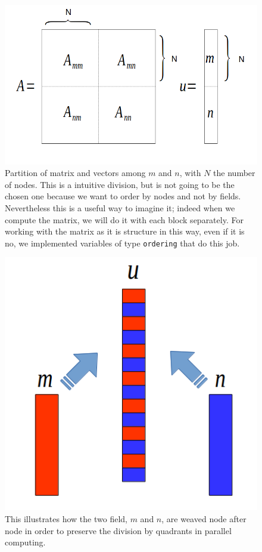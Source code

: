 \begin{figure}[h]
	\centering
	\includegraphics[width=0.7\linewidth]{A_m_n}
	\caption[Partition of matrix and vectors among $ m $ and $ n $]{Partition of matrix and vectors among $ m $ and $ n $, with $ N $ the number of nodes. This is a intuitive division, but is not going to be the chosen one because we want to order by nodes and not by fields. Nevertheless this is a useful way to imagine it; indeed when we compute the matrix, we will do it with each block separately. For working with the matrix as it is structure in this way, even if it is no, we implemented variables of type \texttt{ordering} that do this job. }
	\label{A_m_n}
\end{figure}
\begin{figure}[h]
	\centering
	\includegraphics[width=0.7\linewidth]{weave}
	\caption[Chain of different fields]{This illustrates how the two field, $ m $ and $ n $, are weaved node after node in order to preserve the division by quadrants in parallel computing.}
	\label{weave}
\end{figure}
 